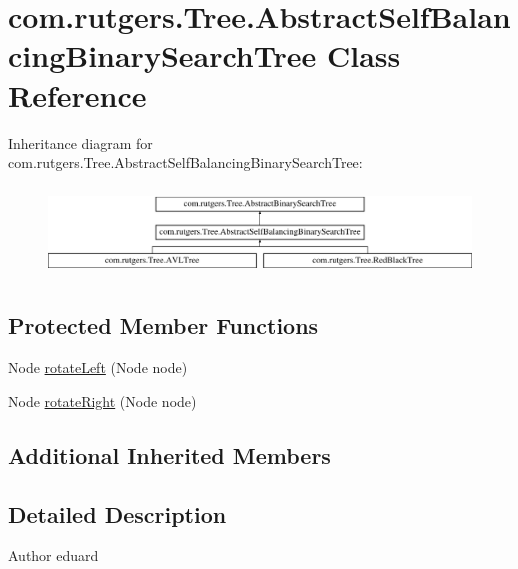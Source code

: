 \hypertarget{classcom_1_1rutgers_1_1Tree_1_1AbstractSelfBalancingBinarySearchTree}{}\section{com.\+rutgers.\+Tree.\+Abstract\+Self\+Balancing\+Binary\+Search\+Tree Class Reference}
\label{classcom_1_1rutgers_1_1Tree_1_1AbstractSelfBalancingBinarySearchTree}
Inheritance diagram for com.\+rutgers.\+Tree.\+Abstract\+Self\+Balancing\+Binary\+Search\+Tree\+:\begin{figure}[H]
\begin{center}
\leavevmode
\includegraphics[height=2.400000cm]{classcom_1_1rutgers_1_1Tree_1_1AbstractSelfBalancingBinarySearchTree}
\end{center}
\end{figure}
\subsection*{Protected Member Functions}
\begin{DoxyCompactItemize}
\item 
Node \hyperlink{classcom_1_1rutgers_1_1Tree_1_1AbstractSelfBalancingBinarySearchTree_a143c3c90b0584ea35cd7b63f6172b4f4}{rotate\+Left} (Node node)
\item 
Node \hyperlink{classcom_1_1rutgers_1_1Tree_1_1AbstractSelfBalancingBinarySearchTree_a96bf5ab757164cf7fd2cf7cccff81276}{rotate\+Right} (Node node)
\end{DoxyCompactItemize}
\subsection*{Additional Inherited Members}


\subsection{Detailed Description}
\begin{DoxyAuthor}{Author}
eduard 
\end{DoxyAuthor}


